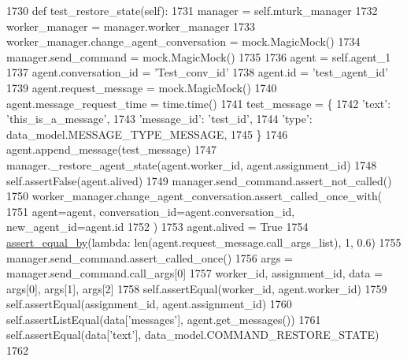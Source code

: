 \begin{DoxyCode}
1730     \textcolor{keyword}{def }test\_restore\_state(self):
1731         manager = self.mturk\_manager
1732         worker\_manager = manager.worker\_manager
1733         worker\_manager.change\_agent\_conversation = mock.MagicMock()
1734         manager.send\_command = mock.MagicMock()
1735 
1736         agent = self.agent\_1
1737         agent.conversation\_id = \textcolor{stringliteral}{'Test\_conv\_id'}
1738         agent.id = \textcolor{stringliteral}{'test\_agent\_id'}
1739         agent.request\_message = mock.MagicMock()
1740         agent.message\_request\_time = time.time()
1741         test\_message = \{
1742             \textcolor{stringliteral}{'text'}: \textcolor{stringliteral}{'this\_is\_a\_message'},
1743             \textcolor{stringliteral}{'message\_id'}: \textcolor{stringliteral}{'test\_id'},
1744             \textcolor{stringliteral}{'type'}: data\_model.MESSAGE\_TYPE\_MESSAGE,
1745         \}
1746         agent.append\_message(test\_message)
1747         manager.\_restore\_agent\_state(agent.worker\_id, agent.assignment\_id)
1748         self.assertFalse(agent.alived)
1749         manager.send\_command.assert\_not\_called()
1750         worker\_manager.change\_agent\_conversation.assert\_called\_once\_with(
1751             agent=agent, conversation\_id=agent.conversation\_id, new\_agent\_id=agent.id
1752         )
1753         agent.alived = \textcolor{keyword}{True}
1754         \hyperlink{namespaceparlai_1_1mturk_1_1core_1_1test_1_1test__mturk__manager_a1fd7ac4fedefa65d2416601107dbe44c}{assert\_equal\_by}(\textcolor{keyword}{lambda}: len(agent.request\_message.call\_args\_list), 1, 0.6)
1755         manager.send\_command.assert\_called\_once()
1756         args = manager.send\_command.call\_args[0]
1757         worker\_id, assignment\_id, data = args[0], args[1], args[2]
1758         self.assertEqual(worker\_id, agent.worker\_id)
1759         self.assertEqual(assignment\_id, agent.assignment\_id)
1760         self.assertListEqual(data[\textcolor{stringliteral}{'messages'}], agent.get\_messages())
1761         self.assertEqual(data[\textcolor{stringliteral}{'text'}], data\_model.COMMAND\_RESTORE\_STATE)
1762 
\end{DoxyCode}
\mbox{\label{classparlai_1_1mturk_1_1core_1_1test_1_1test__mturk__manager_1_1TestMTurkManagerConnectedFunctions_a48675334851096c3530dbe1b8b206ba4}} 
